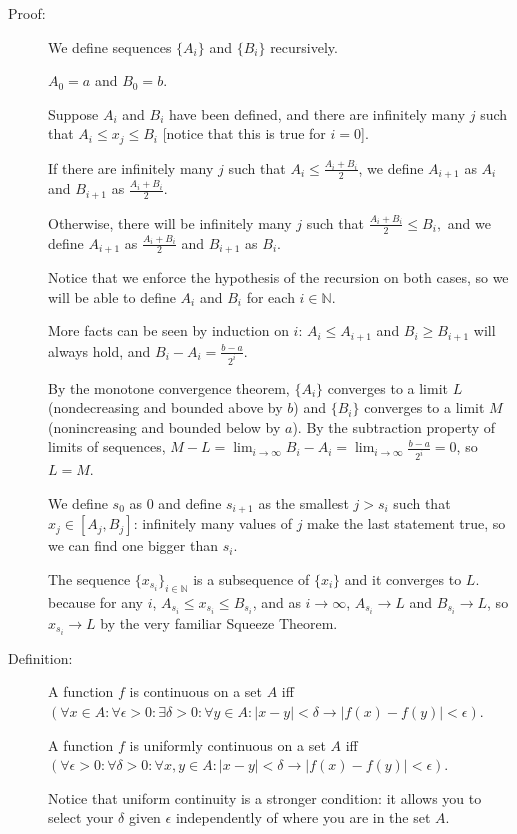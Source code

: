 \documentclass[12pt]{article}
\begin{document}
\begin{description}
\item[Proof:]  We define sequences $\{A_i\}$ and $\{B_i\}$ recursively.

$A_0 = a$ and $B_0 = b$.

Suppose $A_i$ and $B_i$ have been defined, and there are infinitely many $j$ such that
$A_i \leq x_j \leq B_i$ [notice that this is true for $i=0$].

If there are infinitely many $j$ such that $A_i \leq \frac{A_i+B_i}2$, we define $A_{i+1}$ as $A_i$
and $B_{i+1}$ as $\frac{A_i+B_i}2$.

Otherwise, there will be infinitely many $j$ such that $\frac{A_i+B_i}2\leq B_i,$ and we define $A_{i+1}$ as
$\frac{A_i+B_i}2$ and $B_{i+1}$ as $B_i$.

Notice that we enforce the hypothesis of the recursion on both cases, so we will be able to define
$A_i$ and $B_i$ for each $i \in \mathbb N$.

More facts can be seen by induction on $i$:  $A_i \leq A_{i+1}$ and $B_i \geq B_{i+1}$ will always
hold, and $B_i - A_i = \frac{b-a}{2^i}$.

By the monotone convergence theorem, $\{A_i\}$ converges to a limit $L$ (nondecreasing and bounded above by $b$) and $\{B_i\}$ converges to a limit $M$ (nonincreasing and bounded below by $a$).  By the subtraction property of limits of sequences, $M - L = \lim_{i \rightarrow \infty} B_i - A_i =
\lim_{i \rightarrow \infty}\frac{b-a}{2^i}=0$, so $L=M$.

We define $s_0$ as 0 and define $s_{i+1}$ as the smallest $j>s_i$ such that $x_j \in [A_j,B_j]$:  infinitely many values of $j$ make the last statement true, so we can find one bigger than $s_i$.

The sequence $\{x_{s_i}\}_{i \in \mathbb N}$ is a subsequence of $\{x_i\}$ and it converges to $L$. because 
for any $i$, $A_{s_i} \leq x_{s_i} \leq B_{s_i}$, and as $i \rightarrow \infty$, $A_{s_i} \rightarrow L$
and $B_{s_i}\rightarrow L$, so $x_{s_i} \rightarrow L$ by the very familiar Squeeze Theorem.

\item[Definition:]  A function $f$ is continuous on a set $A$ iff $(\forall x \in A: \forall \epsilon >0:\exists \delta>0:\forall y \in A:|x-y|<\delta \rightarrow |f(x)-f(y)|<\epsilon)$.

A function $f$ is uniformly continuous on a set $A$ iff $(\forall \epsilon >0:\forall \delta >0: \forall x,y \in A:
|x - y|<\delta \rightarrow |f(x)-f(y)|<\epsilon)$.

Notice that uniform continuity is a stronger condition:  it allows you to select your $\delta$ given $\epsilon$ independently of where you are in the set $A$.


\end{description}
\end{document}
